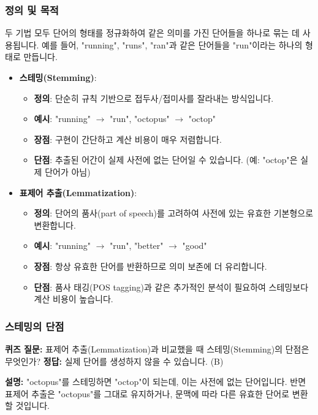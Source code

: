 \documentclass[11pt,a4paper]{article}
\theoremstyle{definition}
\begin{document}
\subsubsection{정의 및 목적}
두 기법 모두 단어의 형태를 정규화하여 같은 의미를 가진 단어들을 하나로 묶는 데 사용됩니다. 예를 들어, "running", "runs", "ran"과 같은 단어들을 "run"이라는 하나의 형태로 만듭니다.

\begin{itemize}
    \item \textbf{스테밍(Stemming)}:
        \begin{itemize}
            \item \textbf{정의}: 단순히 규칙 기반으로 접두사/접미사를 잘라내는 방식입니다.
            \item \textbf{예시}: "running" $\rightarrow$ "run", "octopus" $\rightarrow$ "octop"
            \item \textbf{장점}: 구현이 간단하고 계산 비용이 매우 저렴합니다.
            \item \textbf{단점}: 추출된 어간이 실제 사전에 없는 단어일 수 있습니다. (예: "octop"은 실제 단어가 아님)
        \end{itemize}
    \item \textbf{표제어 추출(Lemmatization)}:
        \begin{itemize}
            \item \textbf{정의}: 단어의 품사(part of speech)를 고려하여 사전에 있는 유효한 기본형으로 변환합니다.
            \item \textbf{예시}: "running" $\rightarrow$ "run", "better" $\rightarrow$ "good"
            \item \textbf{장점}: 항상 유효한 단어를 반환하므로 의미 보존에 더 유리합니다.
            \item \textbf{단점}: 품사 태깅(POS tagging)과 같은 추가적인 분석이 필요하여 스테밍보다 계산 비용이 높습니다.
        \end{itemize}
\end{itemize}

\subsubsection{스테밍의 단점}

\begin{tcolorbox}[examplebox, title=\textbf{예시}]
\textbf{퀴즈 질문:} 표제어 추출(Lemmatization)과 비교했을 때 스테밍(Stemming)의 단점은 무엇인가?
\textbf{정답:} 실제 단어를 생성하지 않을 수 있습니다. (B)

\textbf{설명:} "octopus"를 스테밍하면 "octop"이 되는데, 이는 사전에 없는 단어입니다. 반면 표제어 추출은 "octopus"를 그대로 유지하거나, 문맥에 따라 다른 유효한 단어로 변환할 것입니다.
\end{tcolorbox}
\end{document}
